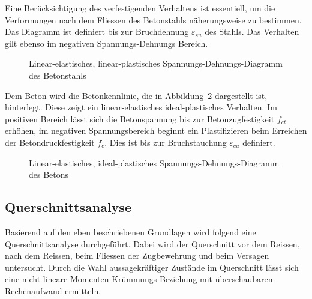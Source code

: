 \documentclass[
  12pt,
  letterpaper,
  egregdoesnotlikesansseriftitles]{scrreprt}
\begin{document}
Eine Berücksichtigung des verfestigenden Verhaltens ist essentiell, um
die Verformungen nach dem Fliessen des Betonstahls näherungsweise zu
bestimmen. Das Diagramm ist definiert bis zur Bruchdehnung
\(\varepsilon_{su}\) des Stahls. Das Verhalten gilt ebenso im negativen
Spannungs-Dehnungs Bereich.

\begin{figure}[H]


\caption{\label{fig-stahlkennlinie}Linear-elastisches,
linear-plastisches Spannungs-Dehnungs-Diagramm des Betonstahls}

\end{figure}%

Dem Beton wird die Betonkennlinie, die in
Abbildung~\ref{fig-betonkennlinie} dargestellt ist, hinterlegt. Diese
zeigt ein linear-elastisches ideal-plastisches Verhalten. Im positiven
Bereich lässt sich die Betonspannung bis zur Betonzugfestigkeit
\(f_{ct}\) erhöhen, im negativen Spannungsbereich beginnt ein
Plastifizieren beim Erreichen der Betondruckfestigkeit \(f_c\). Dies ist
bis zur Bruchstauchung \(\varepsilon_{cu}\) definiert.

\begin{figure}[H]


\caption{\label{fig-betonkennlinie}Linear-elastisches, ideal-plastisches
Spannungs-Dehnungs-Diagramm des Betons}

\end{figure}%

\subsection{Querschnittsanalyse}\label{querschnittsanalyse}

Basierend auf den eben beschriebenen Grundlagen wird folgend eine
Querschnittsanalyse durchgeführt. Dabei wird der Querschnitt vor dem
Reissen, nach dem Reissen, beim Fliessen der Zugbewehrung und beim
Versagen untersucht. Durch die Wahl aussagekräftiger Zustände im
Querschnitt lässt sich eine nicht-lineare Momenten-Krümmungs-Beziehung
mit überschaubarem Rechenaufwand ermitteln.
\end{document}
